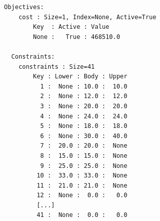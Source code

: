 \documentclass[11pt]{article}
\makeatletter
\newcommand{\boxspacing}{\kern\kvtcb@left@rule\kern\kvtcb@boxsep}
\newcommand{\prompt}[4]{
        {\ttfamily\llap{{\color{#2}[#3]:\hspace{3pt}#4}}\vspace{-\baselineskip}}
    }
\makeatother
\begin{document}
\begin{Verbatim}[commandchars=\\\{\}]
  Objectives:
    cost : Size=1, Index=None, Active=True
        Key  : Active : Value
        None :   True : 468510.0

  Constraints:
    constraints : Size=41
        Key : Lower : Body : Upper
          1 :  None : 10.0 :  10.0
          2 :  None : 12.0 :  12.0
          3 :  None : 20.0 :  20.0
          4 :  None : 24.0 :  24.0
          5 :  None : 18.0 :  18.0
          6 :  None : 30.0 :  40.0
          7 :  20.0 : 20.0 :  None
          8 :  15.0 : 15.0 :  None
          9 :  25.0 : 25.0 :  None
         10 :  33.0 : 33.0 :  None
         11 :  21.0 : 21.0 :  None
         12 :  None :  0.0 :   0.0
         [...]
         41 :  None :  0.0 :   0.0
    \end{Verbatim}

    \begin{tcolorbox}[breakable, size=fbox, boxrule=1pt, pad at break*=1mm,colback=cellbackground, colframe=cellborder]
\prompt{In}{incolor}{ }{\boxspacing}
\begin{Verbatim}[commandchars=\\\{\}]

\end{Verbatim}
\end{tcolorbox}


    
    
    
\end{document}
